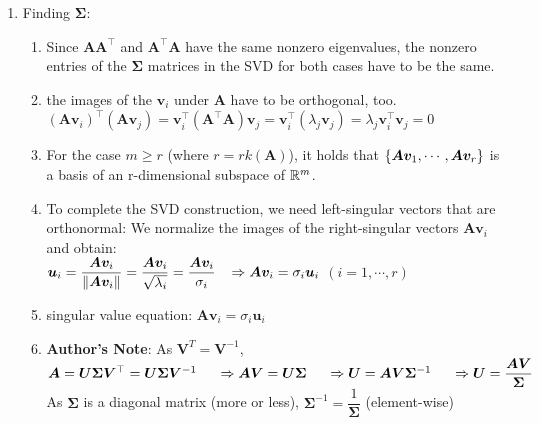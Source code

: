 \begin{enumerate}
    \item Finding $\bm{\Sigma}$:
    \begin{enumerate}
        \item Since $\bm{AA^\top}$ and $\bm{A ^\top A}$ have the same nonzero eigenvalues, the nonzero entries of the $\bm{\Sigma}$ matrices in the SVD for both cases have to be the same.
        \hfill \cite{mfml/book/mml/Deisenroth-Faisal-Ong}

        \item  the images of the $\bm{v}_i$ under $\bm{A}$ have to be orthogonal, too.
        \hfill \cite{mfml/book/mml/Deisenroth-Faisal-Ong}
        \\
        $
            (\bm{Av}_i)^\top (\bm{Av}_j ) =
            \bm{v}^\top _i(\bm{A}^\top \bm{A})\bm{v}_j =
            \bm{v}^\top _i(\lambda _j\bm{v}_j ) =
            \lambda _j\bm{v}^\top _i \bm{v}_j
            = 0
        $
        \hfill \cite{mfml/book/mml/Deisenroth-Faisal-Ong}

        \item For the case $m \geq r$ (where $r = rk(\bm{A})$), it holds that $\left\{\bm{Av}_1, \cdots , \bm{Av}_r\right\}$ is a basis of an r-dimensional subspace of $\mathbb{R}^m$.
        \hfill \cite{mfml/book/mml/Deisenroth-Faisal-Ong}

        \item To complete the SVD construction, we need left-singular vectors that are orthonormal:
        We normalize the images of the right-singular vectors $\bm{Av}_i$ and obtain:
        \hfill \cite{mfml/book/mml/Deisenroth-Faisal-Ong}
        \\
        $
            \bm{u}_i = \dfrac{\bm{Av}_i}{\left\| \bm{Av}_i \right\|}
            = \dfrac{\bm{Av}_i}{\sqrt{\lambda_i}}
            = \dfrac{\bm{Av}_i}{\sigma_i}
            \hspace{0.3cm}
            \Rightarrow
            \bm{Av}_i = \sigma_i \bm{u}_i
        $
        \hfill
        $
            (i = 1, \cdots , r)
        $
        \hfill \cite{mfml/book/mml/Deisenroth-Faisal-Ong}

        \item singular value equation: $\bm{Av}_i = \sigma_i \bm{u}_i$
        \hfill \cite{mfml/book/mml/Deisenroth-Faisal-Ong}

        \item \textbf{Author's Note}: As $\bm{V}^T = \bm{V}^{-1}$,
        \\
        $
            \bm{A} = \bm{U\Sigma V}^\top = \bm{U\Sigma V}^{-1}
            \hspace{0.5cm}
            \Rightarrow
            \bm{AV} = \bm{U\Sigma}
            \hspace{0.5cm}
            \Rightarrow
            \bm{U} = \bm{AV\Sigma}^{-1}
            \hspace{0.5cm}
            \Rightarrow
            \bm{U} = \dfrac{\bm{AV}}{\bm{\Sigma}}
        $
        \\
        As $\bm{\Sigma}$ is a diagonal matrix (more or less), $\bm{\Sigma}^{-1} = \dfrac{1}{\bm{\Sigma}}$ (element-wise)


\end{enumerate}
\end{enumerate}
